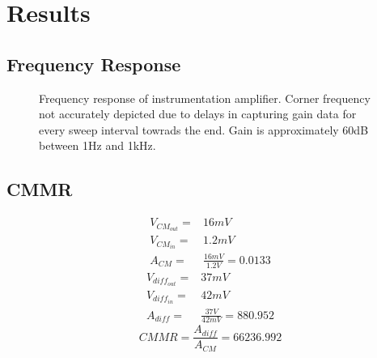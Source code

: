 \documentclass{article}
\begin{document}
\section{Results}
\subsection{Frequency Response}
\begin{figure}[H]
    \begin{center}
    \end{center}
    \caption{Frequency response of instrumentation amplifier. Corner frequency not accurately depicted due to delays in capturing gain data for every sweep interval towrads the end. Gain is approximately 60dB between 1Hz and 1kHz.}
    \label{fig:gain-plot}
\end{figure}
\subsection{CMMR}
\begin{equation*}
    \begin{aligned}
        V_{CM_{out}} =& 16mV \\
        V_{CM_{in}}  =& 1.2mV \\
        A_{CM} =& \frac{16mV}{1.2V} = 0.0133
    \end{aligned}
\end{equation*}
\newline
\begin{equation*}
    \begin{aligned}
        V_{diff_{out}} =& 37mV \\
        V_{diff_{in}}  =& 42mV \\
        A_{diff} =& \frac{37V}{42mV} = 880.952
    \end{aligned}
\end{equation*}
\newline
\begin{equation*}
    CMMR = \frac{A_{diff}}{A_{CM}} = 66236.992
\end{equation*}
\end{document}
